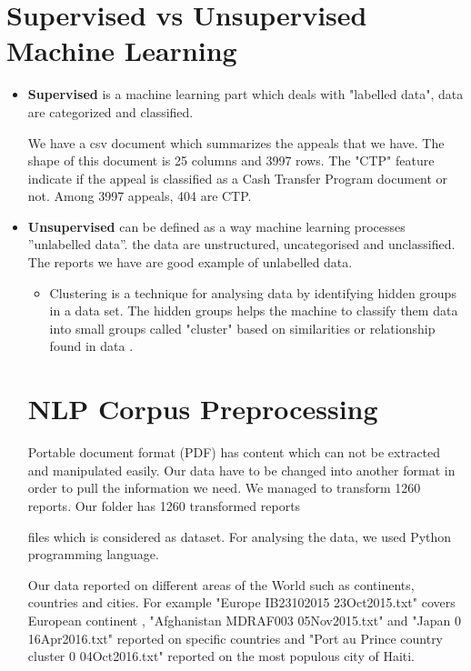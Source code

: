 \section{Supervised vs Unsupervised  Machine Learning}
\begin{itemize}
\item \textbf{Supervised} is a machine learning part which deals with "labelled data",  data are categorized and classified.

 We have a csv document which summarizes
the appeals that we have. The shape of this document is 25 columns and 3997 rows. The "CTP" feature indicate if the appeal is classified as a Cash
  Transfer Program document  or not. Among 3997 appeals, 404 are CTP.

\item \textbf{Unsupervised} can be defined as a way machine learning processes ”unlabelled data”.
the data are unstructured, uncategorised and unclassified. The reports we have are good example of unlabelled data.
\begin{itemize}
\item Clustering is a technique for analysing data by identifying hidden groups in a data set. The hidden groups helps the machine to  classify them data into small groups called "cluster" based on similarities or relationship found in data \citep{dy2004feature}.
\end{itemize}
\section{NLP Corpus Preprocessing }\label{re}

Portable document format (PDF) has content which can not be extracted and manipulated  easily. Our data have to be changed into another format in order to pull the information we need. We managed to transform 1260 reports.  Our folder has 1260 transformed reports

files which is considered as dataset. For analysing the data, we used  Python programming language.

Our data reported on different areas of the World such as continents, countries and cities. For example "Europe IB23102015 23Oct2015.txt" covers European continent , "Afghanistan MDRAF003 05Nov2015.txt" and  "Japan 0 16Apr2016.txt" reported  on specific countries and  "Port au Prince country cluster 0 04Oct2016.txt" reported on the most populous city of Haiti.



\end{itemize}
